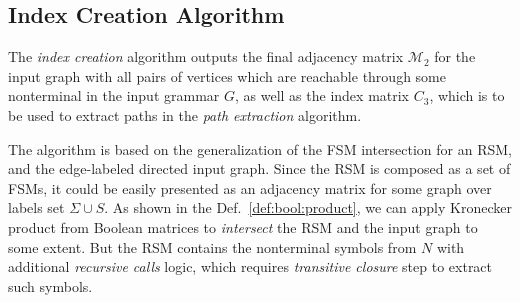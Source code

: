 \subsection{Index Creation Algorithm}

The \textit{index creation} algorithm outputs the final adjacency matrix $\mathcal{M}_2$ for the input graph with all pairs of vertices which are reachable through some nonterminal in the input grammar $G$, as well as the index matrix $C_3$, which is to be used to extract paths in the \textit{path extraction} algorithm.

The algorithm is based on the generalization of the FSM intersection for an RSM,  and the edge-labeled directed input graph.
Since the RSM is composed as a set of FSMs, it could be easily presented as an adjacency matrix for some graph over labels set $\Sigma \cup S$.
As shown in the Def.~\ref{def:bool:product}, we can apply Kronecker product from Boolean matrices to \textit{intersect} the RSM and the input graph to some extent.
But the RSM contains the nonterminal symbols from $N$ with additional \textit{recursive calls} logic, which requires \textit{transitive closure} step to extract such symbols.

